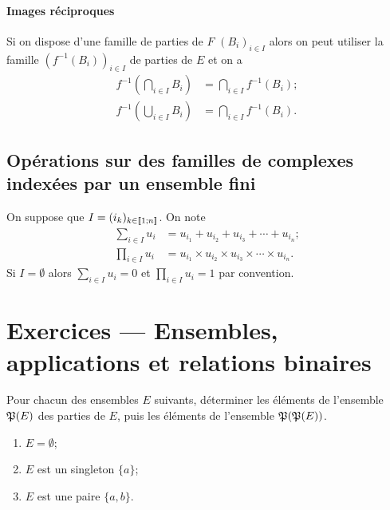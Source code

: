 \paragraph{Images réciproques}
\label{chap3-par:imagerec}

Si on dispose d'une famille de parties de \(F\) \((B_i)_{i \in I}\) alors on 
peut utiliser la famille \((f^{-1}(B_i))_{i \in I}\) de parties de \(E\) et on a
\begin{align}
    f^{-1} \left(\bigcap\limits_{i \in I} B_i\right) &= \bigcap\limits_{i \in I} 
    f^{-1}(B_i);\\
    f^{-1} \left(\bigcup\limits_{i \in I} B_i\right) &= \bigcap\limits_{i \in I} 
    f^{-1}(B_i).
\end{align}

\subsection{Opérations sur des familles de complexes indexées par un ensemble 
fini}
\label{chap3-subsec:operationsfamilles}
On suppose que \(I = (i_k)_{k \in  \mathopen{\llbracket}1\mathclose{}\mathpunct{};n\mathclose{\rrbracket}}\). On note 
\begin{align}
    \sum_{i \in I} u_i &= u_{i_1} +u_{i_2} +u_{i_3} + \dotsb +u_{i_n};\\
    \prod_{i \in I} u_i &= u_{i_1} \times u_{i_2} \times u_{i_3} \times \dotsm 
    \times u_{i_n}.
\end{align}
Si \(I = \emptyset\) alors \(\sum_{i \in I} u_i = 0\) et \(\prod_{i \in I} u_i = 1\) par convention.

\section{Exercices --- Ensembles, applications et relations binaires}

\begin{exercice}
    Pour chacun des ensembles \(E\) suivants, déterminer les éléments de 
    l'ensemble \(\mathfrak{P}(E)\) des parties de \(E\), puis les éléments de 
    l'ensemble \(\mathfrak{P}(\mathfrak{P}(E))\).
    \begin{enumerate}
        \item \(E = \emptyset\);
        \item \(E\) est un singleton \(\{a\}\);
        \item \(E\) est une paire \(\{a, b\}\).
    \end{enumerate}
\end{exercice}

